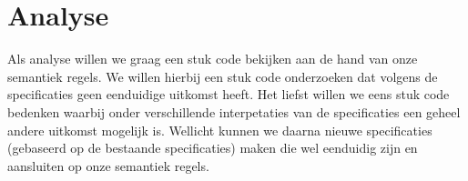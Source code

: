 \section{Analyse}
\label{sec:analyse}
Als analyse willen we graag een stuk code bekijken aan de hand van onze semantiek regels. We willen hierbij een stuk code onderzoeken dat volgens de specificaties geen eenduidige uitkomst heeft. Het liefst willen we eens stuk code bedenken waarbij onder verschillende interpetaties van de specificaties een geheel andere uitkomst mogelijk is. Wellicht kunnen we daarna nieuwe specificaties (gebaseerd op de bestaande specificaties) maken die wel eenduidig zijn en aansluiten op onze semantiek regels. 